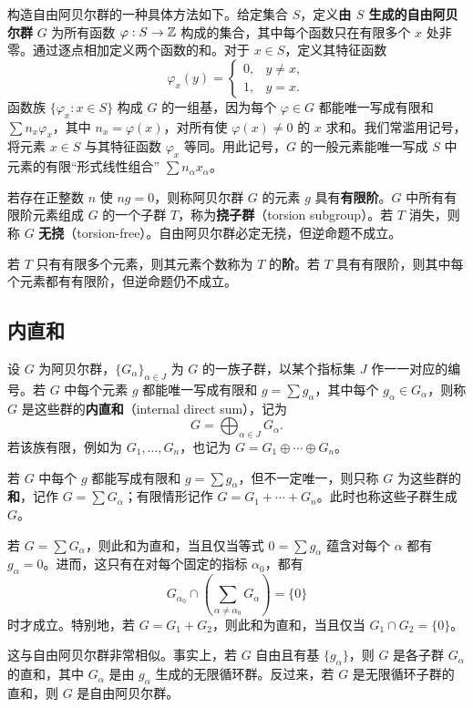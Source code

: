 构造自由阿贝尔群的一种具体方法如下。给定集合 $S$，定义\textbf{由 $S$ 生成的自由阿贝尔群} $G$ 为所有函数 $\varphi:S\to\mathbb{Z}$ 构成的集合，其中每个函数只在有限多个 $x$ 处非零。通过逐点相加定义两个函数的和。对于 $x\in S$，定义其特征函数
\[
\varphi_x(y)=\begin{cases}0,&y\ne x,\\1,&y=x.\end{cases}
\]
函数族 $\{\varphi_x:x\in S\}$ 构成 $G$ 的一组基，因为每个 $\varphi\in G$ 都能唯一写成有限和 $\sum n_x\varphi_x$，其中 $n_x=\varphi(x)$，对所有使 $\varphi(x)\ne0$ 的 $x$ 求和。我们常滥用记号，将元素 $x\in S$ 与其特征函数 $\varphi_x$ 等同。用此记号，$G$ 的一般元素能唯一写成 $S$ 中元素的有限“形式线性组合” $\sum n_\alpha x_\alpha$。

若存在正整数 $n$ 使 $ng=0$，则称阿贝尔群 $G$ 的元素 $g$ 具有\textbf{有限阶}。$G$ 中所有有限阶元素组成 $G$ 的一个子群 $T$，称为\textbf{挠子群}（torsion subgroup）。若 $T$ 消失，则称 $G$ \textbf{无挠}（torsion-free）。自由阿贝尔群必定无挠，但逆命题不成立。

若 $T$ 只有有限多个元素，则其元素个数称为 $T$ 的\textbf{阶}。若 $T$ 具有有限阶，则其中每个元素都有有限阶，但逆命题仍不成立。

\subsection*{内直和}
设 $G$ 为阿贝尔群，$\{G_\alpha\}_{\alpha\in J}$ 为 $G$ 的一族子群，以某个指标集 $J$ 作一一对应的编号。若 $G$ 中每个元素 $g$ 都能唯一写成有限和 $g=\sum g_\alpha$，其中每个 $g_\alpha\in G_\alpha$，则称 $G$ 是这些群的\textbf{内直和}（internal direct sum），记为
\[
G=\bigoplus_{\alpha\in J}G_\alpha.
\]
若该族有限，例如为 $G_1,\ldots,G_n$，也记为 $G=G_1\oplus\cdots\oplus G_n$。

若 $G$ 中每个 $g$ 都能写成有限和 $g=\sum g_\alpha$，但不一定唯一，则只称 $G$ 为这些群的\textbf{和}，记作 $G=\sum G_\alpha$；有限情形记作 $G=G_1+\cdots+G_n$。此时也称这些子群生成 $G$。

若 $G=\sum G_\alpha$，则此和为直和，当且仅当等式 $0=\sum g_\alpha$ 蕴含对每个 $\alpha$ 都有 $g_\alpha=0$。进而，这只有在对每个固定的指标 $\alpha_0$，都有
\[
G_{\alpha_0}\cap\left(\sum_{\alpha\ne\alpha_0}G_\alpha\right)=\{0\}
\]
时才成立。特别地，若 $G=G_1+G_2$，则此和为直和，当且仅当 $G_1\cap G_2=\{0\}$。

这与自由阿贝尔群非常相似。事实上，若 $G$ 自由且有基 $\{g_\alpha\}$，则 $G$ 是各子群 $G_\alpha$ 的直和，其中 $G_\alpha$ 是由 $g_\alpha$ 生成的无限循环群。反过来，若 $G$ 是无限循环子群的直和，则 $G$ 是自由阿贝尔群。

